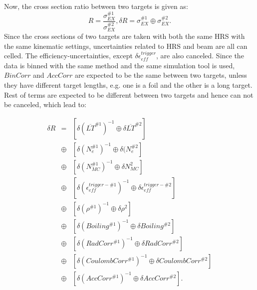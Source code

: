 Now, the cross section ratio between two targets is given as:
\begin{equation}
  R = \frac{\sigma_{EX}^{\#1}}{\sigma_{EX}^{\#2}}, \delta R = \sigma_{EX}^{\#1} \oplus \sigma_{EX}^{\#2}.
\end{equation}
Since the cross sections of two targets are taken with both the same HRS with the same kinematic settings, uncertainties related to HRS and beam are all can celled. The efficiency-uncertainties, except $\delta \epsilon_{eff}^{trigger}$, are also canceled. Since the data is binned with the same method and the same simulation tool is used, $BinCorr$ and $AccCorr$ are expected to be the same between two targets, unless they have different target lengths, e.g. one is a foil and the other is a long target. Rest of terms are expected to be different between two targets and hence can not be canceled, which lead to:

\begin{eqnarray*}
  \delta R &=& [\delta (\overline{LT}^{\#1})^{-1}\oplus \delta \overline{LT}^{\#2}]  \\
            &\oplus& [\delta (N_{e}^{\#1})^{-1} \oplus \delta (N_{e}^{\#2}]  \\
            &\oplus& [\delta (N_{MC}^{\#1})^{-1}\oplus \delta N_{MC}^{2}]  \\
            &\oplus& [\delta (\epsilon_{eff}^{trigger-\#1})^{-1}\oplus\delta \epsilon_{eff}^{trigger-\#2} ] \\
            &\oplus& [\delta (\rho^{\#1})^{-1} \oplus\delta \rho^{2}]  \\
            &\oplus& [\delta (Boiling^{\#1})^{-1} \oplus\delta Boiling^{\#2}]  \\
            &\oplus& [\delta (RadCorr^{\#1})^{-1} \oplus\delta RadCorr^{\#2}]  \\
            &\oplus& [\delta (CoulombCorr^{\#1})^{-1} \oplus\delta CoulombCorr^{\#2}]  \\
            &\oplus& [\delta (AccCorr^{\#1})^{-1} \oplus\delta AccCorr^{\#2}].
\end{eqnarray*}

